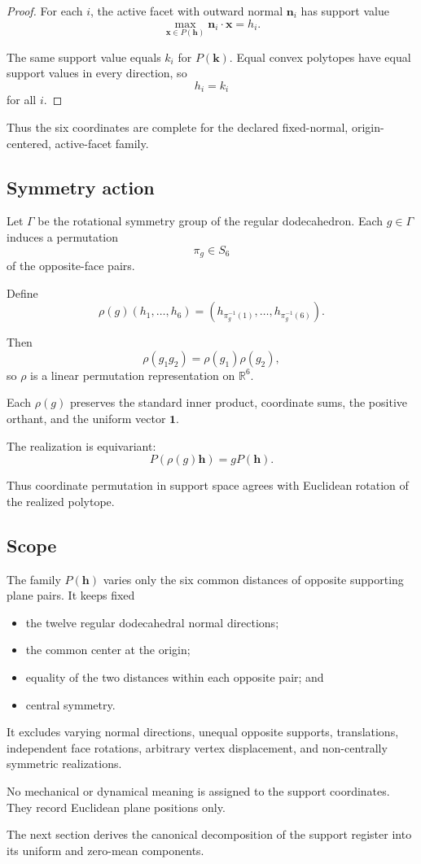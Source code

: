 \begin{proof}
For each \(i\), the active facet with outward normal \(\mathbf n_i\) has
support value
\[
\max_{\mathbf x\in P(\mathbf h)}
\mathbf n_i\cdot\mathbf x
=
h_i.
\]

The same support value equals \(k_i\) for \(P(\mathbf k)\). Equal convex
polytopes have equal support values in every direction, so
\[
h_i=k_i
\]
for all \(i\).
\end{proof}

Thus the six coordinates are complete for the declared fixed-normal,
origin-centered, active-facet family.

\subsection{Symmetry action}

Let \(\Gamma\) be the rotational symmetry group of the regular
dodecahedron. Each \(g\in\Gamma\) induces a permutation
\[
\pi_g\in S_6
\]
of the opposite-face pairs.

Define
\[
\rho(g)(h_1,\ldots,h_6)
=
(h_{\pi_g^{-1}(1)},\ldots,h_{\pi_g^{-1}(6)}).
\]

Then
\[
\rho(g_1g_2)
=
\rho(g_1)\rho(g_2),
\]
so \(\rho\) is a linear permutation representation on \(\mathbb R^6\).

Each \(\rho(g)\) preserves the standard inner product, coordinate sums,
the positive orthant, and the uniform vector \(\mathbf 1\).

The realization is equivariant:
\[
P(\rho(g)\mathbf h)
=
gP(\mathbf h).
\]

Thus coordinate permutation in support space agrees with Euclidean rotation
of the realized polytope.

\subsection{Scope}

The family \(P(\mathbf h)\) varies only the six common distances of
opposite supporting plane pairs. It keeps fixed

\begin{itemize}
\item the twelve regular dodecahedral normal directions;
\item the common center at the origin;
\item equality of the two distances within each opposite pair; and
\item central symmetry.
\end{itemize}

It excludes varying normal directions, unequal opposite supports,
translations, independent face rotations, arbitrary vertex displacement,
and non-centrally symmetric realizations.

No mechanical or dynamical meaning is assigned to the support coordinates.
They record Euclidean plane positions only.

The next section derives the canonical decomposition of the support register
into its uniform and zero-mean components.
